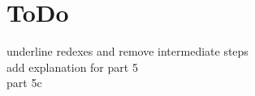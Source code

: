 \documentclass{article}
\begin{document}
	
	\newpage
	
	\section{ToDo}
	
	\begin{Large}
		underline redexes and remove intermediate steps\\
		
		add explanation for part 5\\
		
		part 5c\\
	\end{Large}
\end{document}
